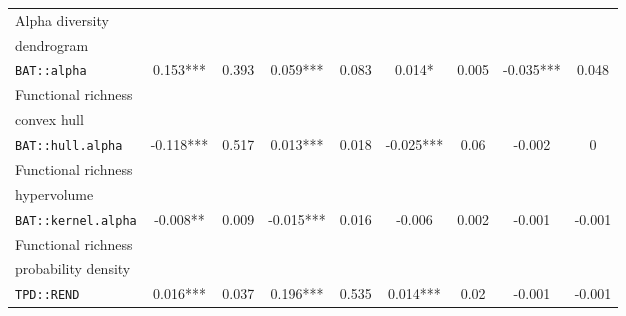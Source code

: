\documentclass[12pt,letterpaper]{article}
\begin{document}
\begin{landscape}
\begin{table}
\begin{tabular}[t]{l|c|c|c|c|c|c|c|c}
\hline
Alpha diversity\\dendrogram\\ \texttt{BAT::alpha} & 0.153*** & 0.393 & 0.059*** & 0.083 & 0.014* & 0.005 & -0.035*** & 0.048\\
\hline
Functional richness\\convex hull\\ \texttt{BAT::hull.alpha} & -0.118*** & 0.517 & 0.013*** & 0.018 & -0.025*** & 0.06 & -0.002 & 0\\
\hline
Functional richness\\hypervolume\\ \texttt{BAT::kernel.alpha} & -0.008** & 0.009 & -0.015*** & 0.016 & -0.006 & 0.002 & -0.001 & -0.001\\
\hline
Functional richness\\probability density\\ \texttt{TPD::REND} & 0.016*** & 0.037 & 0.196*** & 0.535 & 0.014*** & 0.02 & -0.001 & -0.001\\
\hline
\end{tabular}
\end{table}
\end{landscape}
\end{document}
